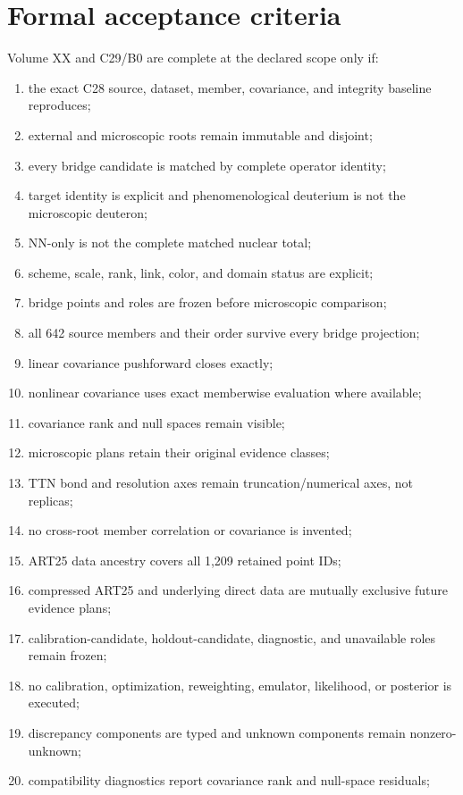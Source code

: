 \documentclass[11pt]{article}
\begin{document}
\section{Formal acceptance criteria}
\label{sec:acceptance}

Volume XX and C29/B0 are complete at the declared scope only if:
\begin{enumerate}
\item the exact C28 source, dataset, member, covariance, and integrity baseline reproduces;
\item external and microscopic roots remain immutable and disjoint;
\item every bridge candidate is matched by complete operator identity;
\item target identity is explicit and phenomenological deuterium is not the microscopic deuteron;
\item NN-only is not the complete matched nuclear total;
\item scheme, scale, rank, link, color, and domain status are explicit;
\item bridge points and roles are frozen before microscopic comparison;
\item all 642 source members and their order survive every bridge projection;
\item linear covariance pushforward closes exactly;
\item nonlinear covariance uses exact memberwise evaluation where available;
\item covariance rank and null spaces remain visible;
\item microscopic plans retain their original evidence classes;
\item TTN bond and resolution axes remain truncation/numerical axes, not replicas;
\item no cross-root member correlation or covariance is invented;
\item ART25 data ancestry covers all 1,209 retained point IDs;
\item compressed ART25 and underlying direct data are mutually exclusive future evidence plans;
\item calibration-candidate, holdout-candidate, diagnostic, and unavailable roles remain frozen;
\item no calibration, optimization, reweighting, emulator, likelihood, or posterior is executed;
\item discrepancy components are typed and unknown components remain nonzero-unknown;
\item compatibility diagnostics report covariance rank and null-space residuals;

\end{enumerate}
\end{document}
